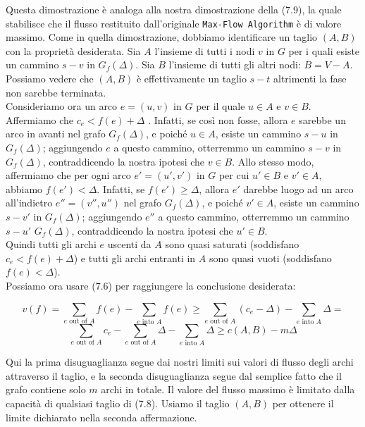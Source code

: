 Questa dimostrazione è analoga alla nostra dimostrazione della (7.9), la
quale stabilisce che il flusso restituito dall'originale
\texttt{Max-Flow\ Algorithm} è di valore massimo. Come in quella
dimostrazione, dobbiamo identificare un taglio $(A, B)$ con la
proprietà desiderata. Sia $A$ l'insieme di tutti i nodi $v$ in $G$
per i quali esiste un cammino $s-v$ in $G_f(\Delta)$. Sia $B$
l'insieme di tutti gli altri nodi: $B = V - A$. Possiamo vedere che
$(A, B)$ è effettivamente un taglio $s-t$ altrimenti la fase non
sarebbe terminata.\\

Consideriamo ora un arco $e = (u, v)$ in $G$ per il quale
$u \in A$ e $v \in B$. Affermiamo che $c_e < f(e) + \Delta$ .
Infatti, se così non fosse, allora $e$ sarebbe un arco in avanti nel
grafo $G_f(\Delta)$, e poiché $u \in A$, esiste un cammino $s-u$
in $G_f(\Delta)$; aggiungendo $e$ a questo cammino, otterremmo un
cammino $s-v$ in $G_f(\Delta)$, contraddicendo la nostra ipotesi che
$v \in B$. Allo stesso modo, affermiamo che per ogni arco
$e' = (u' , v')$ in $G$ per cui $u' \in B$ e $v' \in A$, abbiamo
$f(e') < \Delta$. Infatti, se $f(e') \ge \Delta$, allora $e'$
darebbe luogo ad un arco all'indietro $e'' = (v'' , u'')$ nel grafo
$G_f(\Delta)$, e poiché $v' \in A$, esiste un cammino $s-v'$ in
$G_f(\Delta)$; aggiungendo $e''$ a questo cammino, otterremmo un
cammino $s-u'$ $G_f(\Delta)$, contraddicendo la nostra ipotesi che
$u' \in B$.\\

Quindi tutti gli archi $e$ uscenti da $A$ sono quasi saturati
(soddisfano $c_e < f(e) + \Delta$) e tutti gli archi entranti in $A$
sono quasi vuoti (soddisfano $f(e) < \Delta$).\\

Possiamo ora usare (7.6) per raggiungere la conclusione desiderata:

$$
v(f) = \sum_{e \text{ out of } A}f(e) - \sum_{e \text{ into } A}f(e) \ge \sum_{e \text{ out of } A}(c_e - \Delta) - \sum_{e \text{ into } A}\Delta =
$$
$$
\sum_{e \text{ out of } A}c_e - \sum_{e \text{ out of } A}\Delta - \sum_{e \text{ into } A}\Delta \ge c(A, B) - m\Delta
$$

Qui la prima disuguaglianza segue dai nostri limiti sui valori di flusso
degli archi attraverso il taglio, e la seconda disuguaglianza segue dal
semplice fatto che il grafo contiene solo $m$ archi in totale. Il
valore del flusso massimo è limitato dalla capacità di qualsiasi taglio
di (7.8). Usiamo il taglio $(A, B)$ per ottenere il limite dichiarato
nella seconda affermazione.

